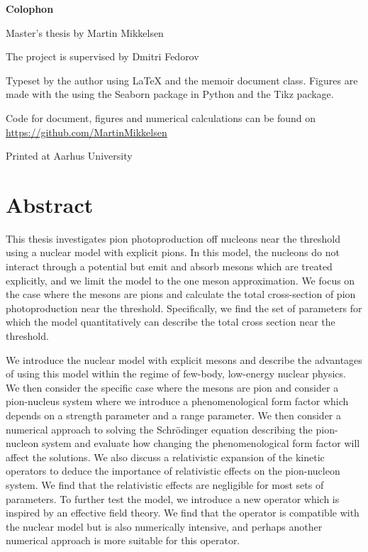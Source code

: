 
\edef\fontandleading{\@memptsize.0/\the\baselineskip}
\makeatother
\thispagestyle{empty}
\strut\vfill
{
	\setlength{\parindent}{0pt}
	\addtolength{\parskip}{.6em}
	
	\begin{center}
		\bfseries\sffamily Colophon
	\end{center}
	
	\small
	
	\textsl{\projecttitle}
	
	\smallskip
	
	Master's thesis by Martin Mikkelsen
	
	The project is supervised by Dmitri Fedorov
	
	Typeset by the author using \LaTeX{} and the \textsf{memoir} document class. Figures are made with the using the Seaborn package in Python and the Tikz package.
	
	Code for document, figures and numerical calculations can be found on \url{https://github.com/MartinMikkelsen}
	
	Printed at Aarhus University
}
\frontmatter
\section*{Abstract}

This thesis investigates pion photoproduction off nucleons near the threshold using a nuclear model with explicit pions. In this model, the nucleons do not interact through a potential but emit and absorb mesons which are treated explicitly, and we limit the model to the one meson approximation. We focus on the case where the mesons are pions and calculate the total cross-section of pion photoproduction near the threshold. Specifically, we find the set of parameters for which the model quantitatively can describe the total cross section near the threshold. 

We introduce the nuclear model with explicit mesons and describe the advantages of using this model within the regime of few-body, low-energy nuclear physics. We then consider the specific case where the mesons are pion and consider a pion-nucleus system where we introduce a phenomenological form factor which depends on a strength parameter and a range parameter. We then consider a numerical approach to solving the Schrödinger equation describing the pion-nucleon system and evaluate how changing the phenomenological form factor will affect the solutions. We also discuss a relativistic expansion of the kinetic operators to deduce the importance of relativistic effects on the pion-nucleon system. We find that the relativistic effects are negligible for most sets of parameters. To further test the model, we introduce a new operator which is inspired by an effective field theory. We find that the operator is compatible with the nuclear model but is also numerically intensive, and perhaps another numerical approach is more suitable for this operator.


